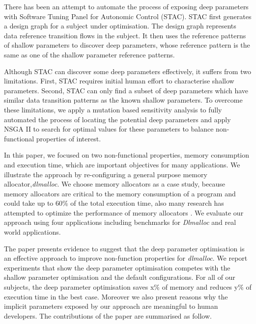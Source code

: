 There has been an attempt to automate the process of exposing deep parameters with Software Tuning Panel for Autonomic Control (STAC)\cite{Brake:2008:ADS:1370018.1370031}. STAC first generates a design graph for a subject under optimisation. The design graph represents data reference transition flows in the subject. It then uses the reference patterns of shallow parameters to discover deep parameters, whose reference pattern is the same as one of the shallow parameter reference patterns. 

Although STAC can discover some deep parameters effectively, it suffers from two limitations. First, STAC requires initial human effort to characterise shallow parameters. Second, STAC can only find a subset of deep parameters which have similar data transition patterns as the known shallow parameters. To overcome these limitations, we apply a mutation based sensitivity analysis to fully automated the process of locating the potential deep parameters and apply NSGA II to search for optimal values for these parameters to balance non-functional properties of interest. 

In this paper, we focused on two non-functional properties, memory consumption and execution time, which are important objectives for many applications. We illustrate the approach by re-configuring a general purpose memory allocator,\emph{dlmalloc}. We choose memory allocators as a case study, because memory allocators are critical to the memory consumption of a program and could take up to 60\% of the total execution time\cite{Zorn:1992:EMS:142181.142200}, also many research has attempted to optimize the performance of memory allocators \cite{Risco-Martin:2009:ODM:1569901.1570116,RiscoMartin2010572}. We evaluate our approach using four applications including benchmarks for \emph{Dlmalloc} and real world applications.

The paper presents evidence to suggest that the deep parameter optimisation is an effective approach to improve non-function properties for \emph{dlmalloc}. 
We report experiments that show the deep parameter optimisation competes with the shallow parameter optimisation and the default configurations. For all of our subjects, the deep parameter optimisation saves x\% of memory and reduces y\% of execution time in the best case. Moreover we also present reasons why the implicit parameters exposed by our approach are meaningful to human developers. The contributions of the paper are summarised as follow.


